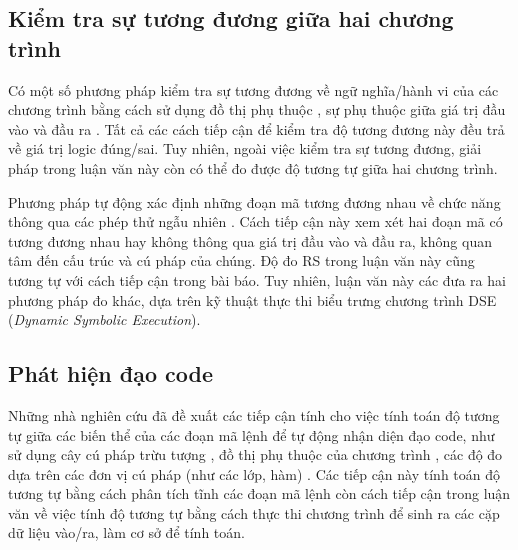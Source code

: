 \subsection*{Kiểm tra sự tương đương giữa hai chương trình}

Có một số phương pháp kiểm tra sự tương đương về ngữ nghĩa/hành vi của
các chương trình bằng cách sử dụng đồ thị phụ thuộc
\cite{bates1993incremental,binkley1992using}, sự phụ thuộc giữa giá
trị đầu vào và đầu ra \cite{jackson1994semantic}. Tất cả các cách tiếp
cận để kiểm tra độ tương đương này đều trả về giá trị logic
đúng/sai. Tuy nhiên, ngoài việc kiểm tra sự tương đương, giải pháp
trong luận văn này còn có thể đo được độ tương tự giữa hai chương
trình.

Phương pháp tự động xác định những đoạn mã tương đương nhau về chức
năng thông qua các phép thử ngẫu nhiên
\cite{jiang2009automatic}. Cách tiếp cận này xem xét hai đoạn mã có
tương đương nhau hay không thông qua giá trị đầu vào và đầu ra, không
quan tâm đến cấu trúc và cú pháp của chúng. Độ đo RS trong luận văn này cũng tương tự với cách tiếp cận trong bài báo. Tuy nhiên, luận văn này các đưa ra hai phương pháp đo khác, dựa trên kỹ thuật thực thi biểu trưng chương trình DSE (\emph{Dynamic Symbolic Execution}).
	

	
	
	
\subsection*{Phát hiện đạo code}

Những nhà nghiên cứu đã đề xuất các tiếp cận tính cho việc tính toán
độ tương tự giữa các biến thể của các đoạn mã lệnh để tự động nhận
diện đạo code, như sử dụng cây cú pháp trừu tượng
\cite{baxter1998clone}, đồ thị phụ thuộc của chương trình
\cite{komondoor2001using}, các độ đo dựa trên các đơn vị cú pháp (như
các lớp, hàm) \cite{dang2012xiao} \cite{merlo2004linear}. Các tiếp cận
này tính toán độ tương tự bằng cách phân tích tĩnh các đoạn mã lệnh
còn cách tiếp cận trong luận văn về việc tính độ tương tự bằng cách
thực thi chương trình để sinh ra các cặp dữ liệu vào/ra, làm cơ sở để
tính toán.
	
